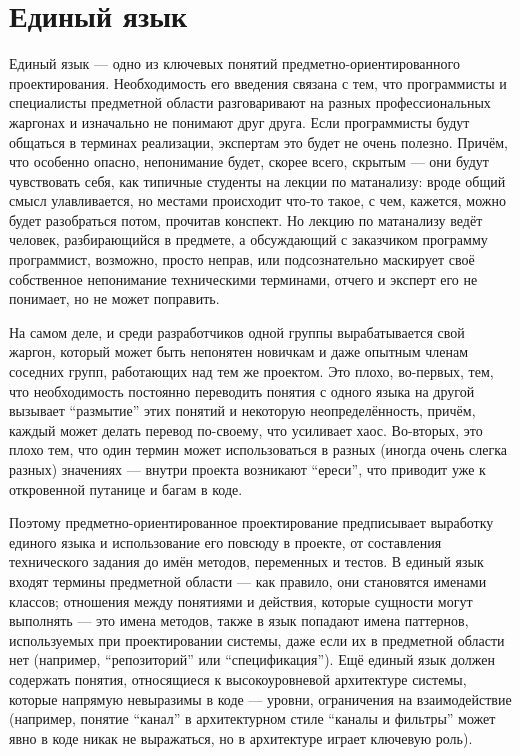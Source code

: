 \documentclass{../../text-style}
\begin{document}
\section{Единый язык}

Единый язык --- одно из ключевых понятий предметно-ориентированного проектирования. Необходимость его введения связана с тем, что программисты и специалисты предметной области разговаривают на разных профессиональных жаргонах и изначально не понимают друг друга. Если программисты будут общаться в терминах реализации, экспертам это будет не очень полезно. Причём, что особенно опасно, непонимание будет, скорее всего, скрытым --- они будут чувствовать себя, как типичные студенты на лекции по матанализу: вроде общий смысл улавливается, но местами происходит что-то такое, с чем, кажется, можно будет разобраться потом, прочитав конспект. Но лекцию по матанализу ведёт человек, разбирающийся в предмете, а обсуждающий с заказчиком программу программист, возможно, просто неправ, или подсознательно маскирует своё собственное непонимание техническими терминами, отчего и эксперт его не понимает, но не может поправить.

На самом деле, и среди разработчиков одной группы вырабатывается свой жаргон, который может быть непонятен новичкам и даже опытным членам соседних групп, работающих над тем же проектом. Это плохо, во-первых, тем, что необходимость постоянно переводить понятия с одного языка на другой вызывает ``размытие'' этих понятий и некоторую неопределённость, причём, каждый может делать перевод по-своему, что усиливает хаос. Во-вторых, это плохо тем, что один термин может использоваться в разных (иногда очень слегка разных) значениях --- внутри проекта возникают ``ереси'', что приводит уже к откровенной путанице и багам в коде.

Поэтому предметно-ориентированное проектирование предписывает выработку единого языка и использование его повсюду в проекте, от составления технического задания до имён методов, переменных и тестов. В единый язык входят термины предметной области --- как правило, они становятся именами классов; отношения между понятиями и действия, которые сущности могут выполнять --- это имена методов, также в язык попадают имена паттернов, используемых при проектировании системы, даже если их в предметной области нет (например, ``репозиторий'' или ``спецификация''). Ещё единый язык должен содержать понятия, относящиеся к высокоуровневой архитектуре системы, которые напрямую невыразимы в коде --- уровни, ограничения на взаимодействие (например, понятие ``канал'' в архитектурном стиле ``каналы и фильтры'' может явно в коде никак не выражаться, но в архитектуре играет ключевую роль).
\end{document}

